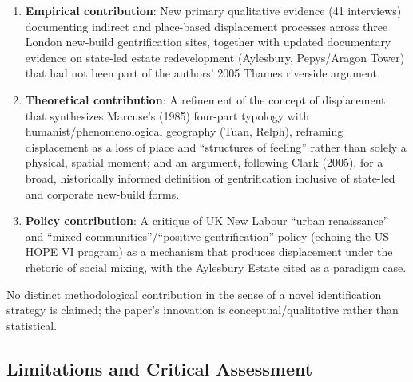 \begin{enumerate}
  \item \textbf{Empirical contribution}: New primary qualitative evidence (41 interviews) documenting indirect and place-based displacement processes across three London new-build gentrification sites, together with updated documentary evidence on state-led estate redevelopment (Aylesbury, Pepys/Aragon Tower) that had not been part of the authors' 2005 Thames riverside argument.
  \item \textbf{Theoretical contribution}: A refinement of the concept of displacement that synthesizes Marcuse's (1985) four-part typology with humanist/phenomenological geography (Tuan, Relph), reframing displacement as a loss of place and ``structures of feeling'' rather than solely a physical, spatial moment; and an argument, following Clark (2005), for a broad, historically informed definition of gentrification inclusive of state-led and corporate new-build forms.
  \item \textbf{Policy contribution}: A critique of UK New Labour ``urban renaissance'' and ``mixed communities''/``positive gentrification'' policy (echoing the US HOPE VI program) as a mechanism that produces displacement under the rhetoric of social mixing, with the Aylesbury Estate cited as a paradigm case.
\end{enumerate}

No distinct methodological contribution in the sense of a novel identification strategy is claimed; the paper's innovation is conceptual/qualitative rather than statistical.

\subsection*{Limitations and Critical Assessment}

